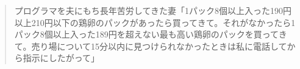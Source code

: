 \begin{quote}
	プログラマを夫にもち長年苦労してきた妻「1パック8個以上入った190円以上210円以下の鶏卵のパックがあったら買ってきて。それがなかったら1パック8個以上入った189円を超えない最も高い鶏卵のパックを買ってきて。売り場について15分以内に見つけられなかったときは私に電話してから指示にしたがって」
\end{quote}
